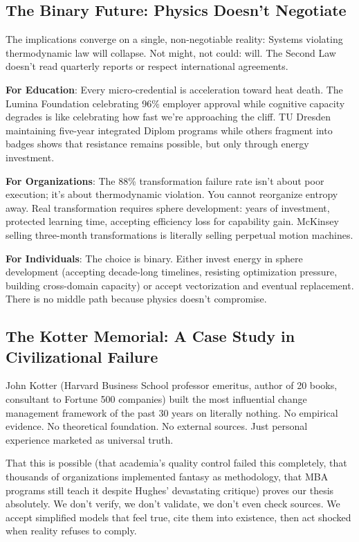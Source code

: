 \subsection{The Binary Future: Physics Doesn't Negotiate}

The implications converge on a single, non-negotiable reality: Systems violating thermodynamic law will collapse. Not might, not could: will. The Second Law doesn't read quarterly reports or respect international agreements.

\textbf{For Education}: Every micro-credential is acceleration toward heat death. The Lumina Foundation celebrating 96\% employer approval while cognitive capacity degrades is like celebrating how fast we're approaching the cliff. TU Dresden maintaining five-year integrated Diplom programs while others fragment into badges shows that resistance remains possible, but only through energy investment.

\textbf{For Organizations}: The 88\% transformation failure rate \citep{bain2024} isn't about poor execution; it's about thermodynamic violation. You cannot reorganize entropy away. Real transformation requires sphere development: years of investment, protected learning time, accepting efficiency loss for capability gain. McKinsey selling three-month transformations is literally selling perpetual motion machines.

\textbf{For Individuals}: The choice is binary. Either invest energy in sphere development (accepting decade-long timelines, resisting optimization pressure, building cross-domain capacity) or accept vectorization and eventual replacement. There is no middle path because physics doesn't compromise.

\subsection{The Kotter Memorial: A Case Study in Civilizational Failure}

John Kotter (Harvard Business School professor emeritus, author of 20 books, consultant to Fortune 500 companies) built the most influential change management framework of the past 30 years on literally nothing. No empirical evidence. No theoretical foundation. No external sources. Just personal experience marketed as universal truth.

That this is possible (that academia's quality control failed this completely, that thousands of organizations implemented fantasy as methodology, that MBA programs still teach it despite Hughes' devastating critique) proves our thesis absolutely. We don't verify, we don't validate, we don't even check sources. We accept simplified models that feel true, cite them into existence, then act shocked when reality refuses to comply.

